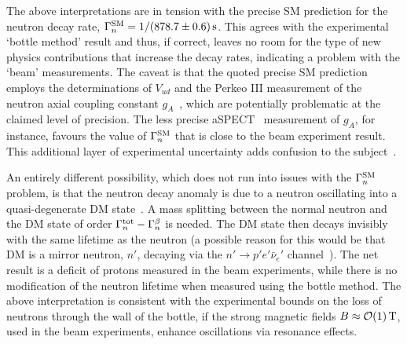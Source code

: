 \smallskip

The above interpretations are in tension with the precise SM prediction for the neutron decay rate,
 $\Gamma_n^{\rm SM} = 1/(878.7 \pm 0.6)\,{\rm s}$. This agrees with the experimental  `bottle method' result and thus, if correct, leaves no room for the type of new physics contributions that increase the decay rates, 
 indicating a problem with the `beam' measurements.
The caveat is that 
the quoted precise SM prediction employs the determinations of $V_{ud}$ 
and the {\sc Perkeo III} measurement of the neutron axial coupling constant $g_A$~\cite{gAexp},
which are potentially problematic at the claimed level of precision.
The less precise aSPECT~\cite{gAexp} measurement of $g_A$, for instance, favours
the value of  $\Gamma_n^{\rm SM} $ that is close to the beam experiment result.
This additional layer of experimental uncertainty adds confusion to the subject~\cite{NeutronBottleAnomaly}.

\smallskip

An entirely different possibility, which does not run into issues with the $\Gamma_n^{\rm SM}$ problem, is that the neutron decay anomaly is due to a neutron oscillating into a  quasi-degenerate DM state~\cite{NeutronBottleAnomaly}.
A mass splitting between the normal neutron and the DM state of order $\Gamma_n^{\rm tot}-\Gamma_n^\beta$ is needed. 
The DM state then decays invisibly with the same lifetime as the neutron (a possible reason for this would be that DM is a mirror neutron, $n'$, decaying via the $n'\to p' e'\bar\nu_e'$ channel~\cite{MirrorSM}).
The net result is a deficit of protons measured in the beam experiments, while there is no modification of the neutron lifetime when measured using the bottle method.
The above interpretation is consistent with the experimental bounds on the loss of neutrons through the wall of the bottle, 
if the strong magnetic fields $B\approx {\mathcal O}(1) \, {\rm T}$,
used in the beam experiments, enhance oscillations via resonance effects.

\smallskip

